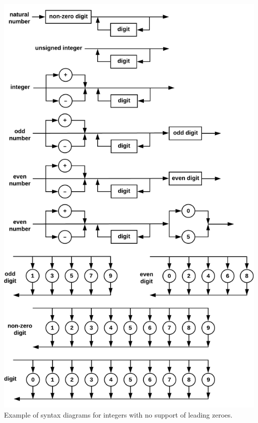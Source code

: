 \documentclass{article}
\begin{document}
			
		\includegraphics[width=\textwidth]{leadingzeroes3}
		\rmfamily
		Example of syntax diagrams for integers with no support of leading zeroes.
\end{document}
